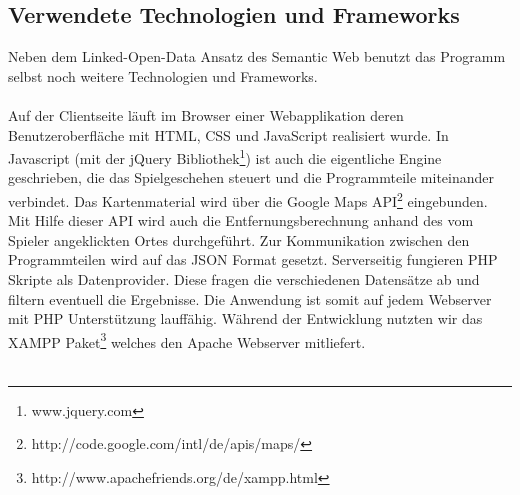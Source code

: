 \documentclass[a4paper, 11pt]{article}
\begin{document}
\subsection{Verwendete Technologien und Frameworks}
Neben dem Linked-Open-Data Ansatz des Semantic Web benutzt das Programm selbst noch weitere Technologien und Frameworks.\\\\
Auf der Clientseite läuft im Browser einer Webapplikation deren Benutzeroberfläche mit HTML, CSS und JavaScript realisiert wurde. In Javascript (mit der jQuery Bibliothek\footnote{www.jquery.com}) ist auch die eigentliche Engine geschrieben, die das Spielgeschehen steuert und die Programmteile miteinander verbindet. Das Kartenmaterial wird über die Google Maps API\footnote{http://code.google.com/intl/de/apis/maps/} eingebunden. Mit Hilfe dieser API wird auch die Entfernungsberechnung anhand des vom Spieler angeklickten Ortes durchgeführt. Zur Kommunikation zwischen den Programmteilen wird auf das JSON Format gesetzt. Serverseitig fungieren PHP Skripte als Datenprovider. Diese fragen die verschiedenen Datensätze ab und filtern eventuell die Ergebnisse. Die Anwendung ist somit auf jedem Webserver mit PHP Unterstützung lauffähig. Während der Entwicklung nutzten wir das XAMPP Paket\footnote{http://www.apachefriends.org/de/xampp.html} welches den Apache Webserver mitliefert. \\\\
\end{document}
